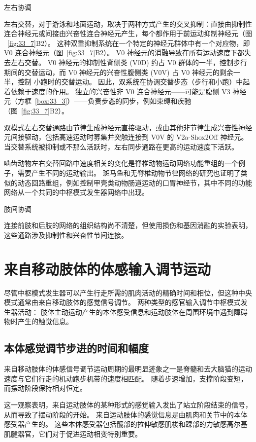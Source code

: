 左右协调

左右交替，对于游泳和地面运动，取决于两种方式产生的交叉抑制：直接由抑制性连合神经元或间接由兴奋性连合神经元产生，每个都作用于前运动抑制神经元（图 ~\ref{fig:33_7}B2）。
这种双重抑制系统在一个特定的神经元群体中有一个对应物，即 V0 连合神经元（图~\ref{fig:33_7}B2）。
V0 神经元的消融导致在所有运动速度下都失去左右交替。
V0 神经元的抑制性背侧类 (V0D) 约占 V0 群体的一半，控制步行期间的交替运动，而 V0 神经元的兴奋性腹侧类 (V0V) 占 V0 神经元的剩余一半，控制 小跑时的交替运动。
因此，双系统在协调交替步态（步行和小跑）中起着依赖于速度的作用。
独立的兴奋性非 V0 连合神经元——可能是腹侧 V3 神经元（方框~\ref{box:33_3}）——负责步态的同步，例如束缚和疾驰（图~\ref{fig:33_7}B2）。


双模式左右交替通路由节律生成神经元直接驱动，或由其他非节律生成兴奋性神经元间接驱动，包括高速运动时募集并突触连接到 V0V 的 V2a-Shox2Off 神经元。
当交替系统被抑制或不那么活跃时，左右同步通路在更高的运动速度下活跃。


啮齿动物左右交替回路中速度相关的变化是脊椎动物运动网络功能重组的一个例子，需要产生不同的运动输出。
斑马鱼和无脊椎动物节律网络的研究也证明了类似的动态回路重组，例如控制甲壳类动物肠道运动的口胃神经节，其中不同的功能网络从一个共同的中枢模式发生器网络中出现。


肢间协调

连接前肢和后肢的网络的组织结构尚不清楚，但使用损伤和基因消融的实验表明，这些通路涉及抑制性和兴奋性节间连接。



\section{来自移动肢体的体感输入调节运动}

尽管中枢模式发生器可以产生行走所需的肌肉活动的精确时间和相位，但这种中央模式通常由来自移动肢体的感觉信号调节。
两种类型的感官输入调节中枢模式发生器活动：
肢体主动运动产生的本体感受信息和运动肢体在周围环境中遇到障碍物时产生的触觉信息。



\subsection{本体感觉调节步进的时间和幅度}

来自移动肢体的体感信号调节运动周期的最明显迹象之一是脊髓和去大脑猫的运动速度与它们行走的机动跑步机带的速度相匹配。
随着步速增加，支撑阶段变短，而摆动阶段保持相对恒定。


这一观察表明，来自运动肢体的某种形式的感觉输入发出了站立阶段结束的信号，从而导致了摆动阶段的开始。
来自运动肢体的感觉信息是由肌肉和关节中的本体感受器产生的。
这些本体感受器包括髋部的拉伸敏感肌梭和踝部的力敏感高尔基肌腱器官，它们对于促进运动相变特别重要。


